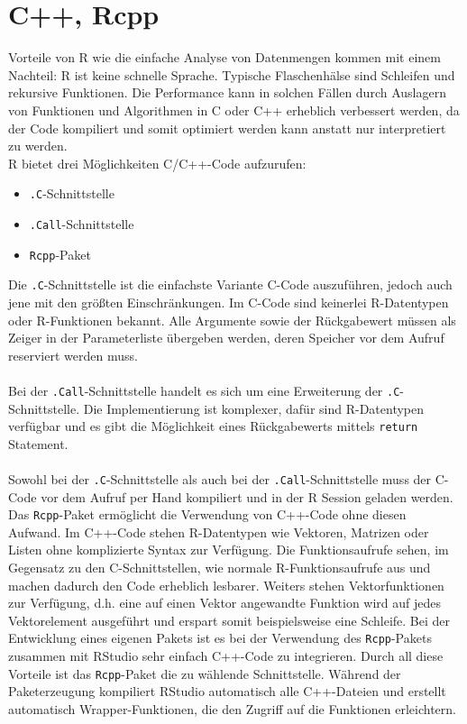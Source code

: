\section{C++, Rcpp}
\label{kapitel:rcpp}
Vorteile von R wie die einfache Analyse von Datenmengen kommen mit einem Nachteil: R ist keine schnelle Sprache. Typische Flaschenhälse sind Schleifen und rekursive Funktionen. Die Performance kann in solchen Fällen durch Auslagern von Funktionen und Algorithmen in C oder C++ erheblich verbessert werden, da der Code kompiliert und somit optimiert werden kann anstatt nur interpretiert zu werden.\\
R bietet drei Möglichkeiten C/C++-Code aufzurufen:
\begin{itemize}
	\item \texttt{.C}-Schnittstelle
	\item \texttt{.Call}-Schnittstelle
	\item \texttt{Rcpp}-Paket
\end{itemize}
Die \texttt{.C}-Schnittstelle ist die einfachste Variante C-Code auszuführen, jedoch auch jene mit den größten Einschränkungen. Im C-Code sind keinerlei R-Datentypen oder R-Funktionen bekannt. Alle Argumente sowie der Rückgabewert müssen als Zeiger in der Parameterliste übergeben werden, deren Speicher vor dem Aufruf reserviert werden muss.
\\
\\
Bei der \texttt{.Call}-Schnittstelle handelt es sich um eine Erweiterung der \texttt{.C}-Schnittstelle. Die Implementierung ist komplexer, dafür sind R-Datentypen verfügbar und es gibt die Möglichkeit eines Rückgabewerts mittels \texttt{return} Statement. \cite{wickham2015r}
\\
\\
Sowohl bei der \texttt{.C}-Schnittstelle als auch bei der \texttt{.Call}-Schnittstelle muss der C-Code vor dem Aufruf per Hand kompiliert und in der R Session geladen werden. Das \texttt{Rcpp}-Paket ermöglicht die Verwendung von C++-Code ohne diesen Aufwand. Im C++-Code stehen R-Datentypen wie Vektoren, Matrizen oder Listen ohne komplizierte Syntax zur Verfügung. Die Funktionsaufrufe sehen, im Gegensatz zu den C-Schnittstellen, wie normale R-Funktionsaufrufe aus und machen dadurch den Code erheblich lesbarer. Weiters stehen Vektorfunktionen zur Verfügung, d.h. eine auf einen Vektor angewandte Funktion wird auf jedes Vektorelement ausgeführt und erspart somit beispielsweise eine Schleife. Bei der Entwicklung eines eigenen Pakets ist es bei der Verwendung des \texttt{Rcpp}-Pakets zusammen mit RStudio sehr einfach C++-Code zu integrieren. Durch all diese Vorteile ist das \texttt{Rcpp}-Paket die zu wählende Schnittstelle. Während der Paketerzeugung kompiliert RStudio automatisch alle C++-Dateien und erstellt automatisch Wrapper-Funktionen, die den Zugriff auf die Funktionen erleichtern.

